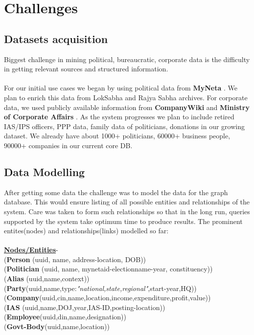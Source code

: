 \chapter{Challenges}


\section{Datasets acquisition}
Biggest challenge in mining political, bureaucratic, corporate data is the difficulty in getting relevant sources and structured information.\\\\
For our initial use cases we began by using political data from \textbf{MyNeta} \cite{MyNeta}. We plan to enrich this data from LokSabha and Rajya Sabha archives.
For corporate data, we used publicly available information from \textbf{CompanyWiki} \cite{CWIKI} and \textbf{Ministry of Corporate Affairs} \cite{MCA}.
As the system progresses we plan to include retired IAS/IPS officers, PPP data, family data of politicians, donations in our growing dataset. We already have about 1000+ politicians, 60000+ business people, 90000+ companies in our current core DB.  

\section{Data Modelling}
After getting some data the challenge was to model the data for the graph database. This would ensure listing of all possible entities and relationships of the system. Care was taken to form such relationships so that in the long run, queries supported by the system take optimum time to produce results.
The prominent entites(nodes) and relationships(links) modelled so far:\\\\
\underline{\textbf{Nodes/Entities}}-\\
(\textbf {Person} (uuid, name, address-location, DOB))\\
(\textbf{Politician} (uuid, name, mynetaid-electionname-year, constituency))\\
(\textbf{Alias} (uuid,name,context))\\
(\textbf{Party}(uuid,name,type:\emph{"national,state,regional"},start-year,HQ))\\
(\textbf{Company}(uuid,cin,name,location,income,expenditure,profit,value))\\
(\textbf{IAS} (uuid,name,DOJ,year,IAS-ID,posting-location))\\
(\textbf{Employee}(uuid,din,name,designation))\\
(\textbf{Govt-Body}(uuid,name,location))\\

